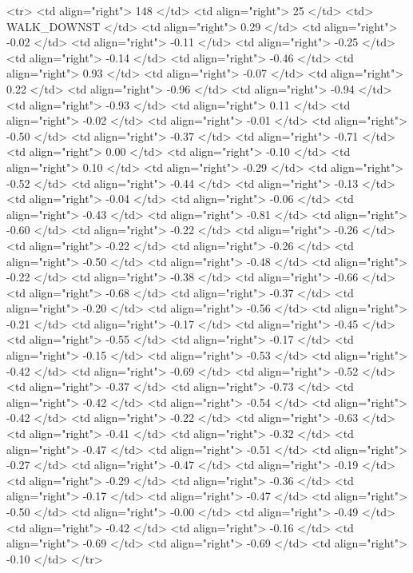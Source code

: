   <tr> <td align="right"> 148 </td> <td align="right">  25 </td> <td> WALK_DOWNST </td> <td align="right"> 0.29 </td> <td align="right"> -0.02 </td> <td align="right"> -0.11 </td> <td align="right"> -0.25 </td> <td align="right"> -0.14 </td> <td align="right"> -0.46 </td> <td align="right"> 0.93 </td> <td align="right"> -0.07 </td> <td align="right"> 0.22 </td> <td align="right"> -0.96 </td> <td align="right"> -0.94 </td> <td align="right"> -0.93 </td> <td align="right"> 0.11 </td> <td align="right"> -0.02 </td> <td align="right"> -0.01 </td> <td align="right"> -0.50 </td> <td align="right"> -0.37 </td> <td align="right"> -0.71 </td> <td align="right"> 0.00 </td> <td align="right"> -0.10 </td> <td align="right"> 0.10 </td> <td align="right"> -0.29 </td> <td align="right"> -0.52 </td> <td align="right"> -0.44 </td> <td align="right"> -0.13 </td> <td align="right"> -0.04 </td> <td align="right"> -0.06 </td> <td align="right"> -0.43 </td> <td align="right"> -0.81 </td> <td align="right"> -0.60 </td> <td align="right"> -0.22 </td> <td align="right"> -0.26 </td> <td align="right"> -0.22 </td> <td align="right"> -0.26 </td> <td align="right"> -0.50 </td> <td align="right"> -0.48 </td> <td align="right"> -0.22 </td> <td align="right"> -0.38 </td> <td align="right"> -0.66 </td> <td align="right"> -0.68 </td> <td align="right"> -0.37 </td> <td align="right"> -0.20 </td> <td align="right"> -0.56 </td> <td align="right"> -0.21 </td> <td align="right"> -0.17 </td> <td align="right"> -0.45 </td> <td align="right"> -0.55 </td> <td align="right"> -0.17 </td> <td align="right"> -0.15 </td> <td align="right"> -0.53 </td> <td align="right"> -0.42 </td> <td align="right"> -0.69 </td> <td align="right"> -0.52 </td> <td align="right"> -0.37 </td> <td align="right"> -0.73 </td> <td align="right"> -0.42 </td> <td align="right"> -0.54 </td> <td align="right"> -0.42 </td> <td align="right"> -0.22 </td> <td align="right"> -0.63 </td> <td align="right"> -0.41 </td> <td align="right"> -0.32 </td> <td align="right"> -0.47 </td> <td align="right"> -0.51 </td> <td align="right"> -0.27 </td> <td align="right"> -0.47 </td> <td align="right"> -0.19 </td> <td align="right"> -0.29 </td> <td align="right"> -0.36 </td> <td align="right"> -0.17 </td> <td align="right"> -0.47 </td> <td align="right"> -0.50 </td> <td align="right"> -0.00 </td> <td align="right"> -0.49 </td> <td align="right"> -0.42 </td> <td align="right"> -0.16 </td> <td align="right"> -0.69 </td> <td align="right"> -0.69 </td> <td align="right"> -0.10 </td> </tr>

